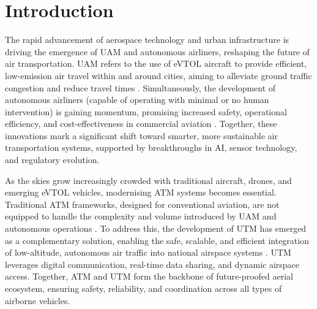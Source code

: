 \section{Introduction}

The rapid advancement of aerospace technology and urban infrastructure is driving the emergence of \gls{UAM} and autonomous airliners, reshaping the future of air transportation.
\Gls{UAM} refers to the use of \gls{eVTOL} aircraft to provide efficient, low-emission air travel within and around cities, aiming to alleviate ground traffic congestion and reduce travel times \cite{easa_uam}.
Simultaneously, the development of autonomous airliners (capable of operating with minimal or no human intervention) is gaining momentum, promising increased safety, operational efficiency, and cost-effectiveness in commercial aviation \cite{Vance_2019}.
Together, these innovations mark a significant shift toward smarter, more sustainable air transportation systems, supported by breakthroughs in \gls{AI}, sensor technology, and regulatory evolution. 

As the skies grow increasingly crowded with traditional aircraft, drones, and emerging \gls{eVTOL} vehicles, modernising \gls{ATM} systems becomes essential.
Traditional \gls{ATM} frameworks, designed for conventional aviation, are not equipped to handle the complexity and volume introduced by \gls{UAM} and autonomous operations \cite{Schuchardt_2023}.
To address this, the development of \gls{UTM} has emerged as a complementary solution, enabling the safe, scalable, and efficient integration of low-altitude, autonomous air traffic into national airspace systems \cite{Singh_2024}.
\Gls{UTM} leverages digital communication, real-time data sharing, and dynamic airspace access.
Together, \gls{ATM} and \gls{UTM} form the backbone of future-proofed aerial ecosystem, ensuring safety, reliability, and coordination across all types of airborne vehicles.


